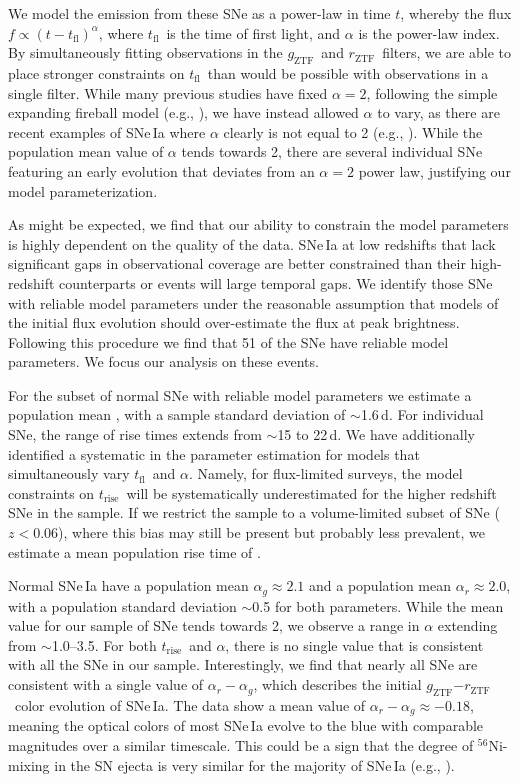 \documentclass[twocolumn]{./aastex63}
\newcommand{\rztf}{$r_\mathrm{ZTF}$}
\newcommand{\gztf}{$g_\mathrm{ZTF}$}
\newcommand{\tfl}{$t_\mathrm{fl}$}
\newcommand{\trise}{$t_\mathrm{rise}$}
\begin{document}
We model the emission from these SNe as a power-law in time $t$, whereby the
flux $f \propto (t - t_\mathrm{fl})^\alpha$, where \tfl\ is the time of first
light, and $\alpha$ is the power-law index. By simultaneously fitting
observations in the \gztf\ and \rztf\ filters, we are able to place stronger
constraints on \tfl\ than would be possible with observations in a single
filter. While many previous studies have fixed $\alpha = 2$, following the
simple expanding fireball model (e.g., \citealt{Riess99a}), we have instead
allowed $\alpha$ to vary, as there are recent examples of SNe\,Ia where
$\alpha$ clearly is not equal to 2 (e.g.,
\citealt{Zheng13,Zheng14,Goobar15,Miller18,Shappee19,Dimitriadis19}). While
the population mean value of $\alpha$ tends towards 2, there are several
individual SNe featuring an early evolution that deviates from an $\alpha = 2$
power law, justifying our model parameterization.

As might be expected, we find that our ability to constrain the model
parameters is highly dependent on the quality of the data. SNe\,Ia at low
redshifts that lack significant gaps in observational coverage are better
constrained than their high-redshift counterparts or events will large
temporal gaps. We identify those SNe with reliable model parameters under the
reasonable assumption that models of the initial flux evolution should
over-estimate the flux at peak brightness. Following this procedure we find
that 51 of the SNe have reliable model parameters. We focus our analysis on
these events.

For the subset of normal SNe with reliable model parameters we estimate a
population mean \edit1{\trise\;$\approx 18.5$\,d}, with a sample standard
deviation of $\sim$1.6\,d. For individual SNe, the range of rise times extends
from $\sim$15 to 22\,d. We have additionally identified a systematic in the
parameter estimation for models that simultaneously vary \tfl\ and $\alpha$.
Namely, for flux-limited surveys, the model constraints on \trise\ will be
systematically underestimated for the higher redshift SNe in the sample. If we
restrict the sample to a volume-limited subset of SNe ($z < 0.06$), where this
bias may still be present but probably less prevalent, we estimate a mean
population rise time of .

Normal SNe\,Ia have a population mean $\alpha_g \approx 2.1$ and a population
mean $\alpha_r \approx 2.0$, with a population standard deviation $\sim$0.5
for both parameters. While the mean value for our sample of SNe tends towards
2, we observe a range in $\alpha$ extending from $\sim$1.0--3.5. For both
\trise\ and $\alpha$, there is no single value that is consistent with all the
SNe in our sample. Interestingly, we find that nearly all SNe are consistent
with a single value of $\alpha_r - \alpha_g$, which describes the initial
\gztf$ - $\rztf\ color evolution of SNe\,Ia. The data show a mean value of
$\alpha_r - \alpha_g \approx -0.18$, meaning the optical colors of most
SNe\,Ia evolve to the blue with comparable magnitudes over a similar
timescale. This could be a sign that the degree of $^{56}$Ni-mixing in the SN
ejecta is very similar for the majority of SNe\,Ia (e.g.,
\citealt{Piro16,Magee18,Magee20}).
\end{document}
